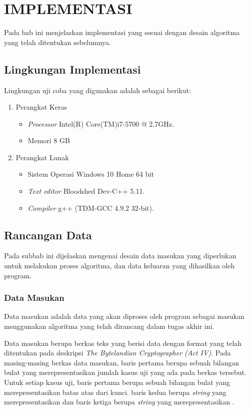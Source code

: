 \renewcommand\thelstlisting{\arabic{chapter}.\arabic{lstlisting}}
\chapter{IMPLEMENTASI}
  Pada bab ini menjelaskan implementasi yang sesuai dengan desain algoritma yang telah ditentukan sebelumnya.
  
  \section{Lingkungan Implementasi}
  Lingkungan uji coba yang digunakan adalah sebagai berikut:
  \begin{enumerate}
  \item Perangkat Keras
  	\begin{itemize}
  		\item \textit{Processor} Intel(R) Core(TM)i7-5700 @ 2.7GHz.
  		\item Memori 8 GB
  	\end{itemize}
  	\item Perangkat Lunak
  		\begin{itemize}
  		\item Sistem Operasi Windows 10 Home 64 bit
  		\item \textit{Text editor} Bloodshed Dev-C++ 5.11.
		\item \textit{Compiler} g++ (TDM-GCC 4.9.2 32-bit).
  		\end{itemize}
  \end{enumerate}
  \section{Rancangan Data}
Pada subbab ini dijelaskan mengenai desain data masukan yang
diperlukan untuk melakukan proses algoritma, dan data keluaran
yang dihasilkan oleh program.

\subsection{Data Masukan}
Data masukan adalah data yang akan diproses oleh program sebagai masukan menggunakan algoritma yang telah dirancang dalam tugas akhir ini.

Data masukan berupa berkas teks yang berisi data dengan format yang telah ditentukan pada deskripsi \textit{The Bytelandian Cryptographer (Act IV)}. Pada masing-masing berkas data masukan, baris pertama berupa sebuah bilangan bulat yang merepresentasikan jumlah kasus uji yang ada pada berkas tersebut. Untuk setiap kasus uji, baris pertama berupa sebuah bilangan bulat yang merepresentasikan batas atas dari kunci. baris kedua berupa \textit{string} yang merepresentasikan \plaintext dan baris ketiga berupa \textit{string} yang merepresentasikan \ciphertext.



